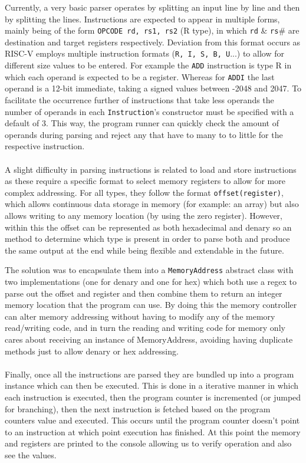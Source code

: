 \documentclass[a4paper,fleqn,twoside,12pt]{article}
\begin{document}
Currently, a very basic parser operates by splitting an input line by line and then by splitting the lines. Instructions are expected to appear in multiple forms, mainly being of the form \texttt{OPCODE rd, rs1, rs2} (R type), in which \texttt{rd} \& \texttt{rs}\# are destination and target registers respectively. Deviation from this format occurs as RISC-V employs multiple instruction formats (\texttt{R, I, S, B, U}...)\cite{risc_spec} to allow for different size values to be entered. For example the \texttt{ADD} instruction is type R in which each operand is expected to be a register. Whereas for \texttt{ADDI} the last operand is a 12-bit immediate, taking a signed values between -2048 and 2047. To facilitate the occurrence further of instructions that take less operands the number of operands in each \texttt{Instruction}'s constructor must be specified with a default of 3. This way, the program runner can quickly check the amount of operands during parsing and reject any that have to many to to little for the respective instruction.
\\\\
A slight difficulty in parsing instructions is related to load and store instructions as these require a specific format to select memory registers to allow for more complex addressing. For all types, they follow the format \texttt{offset(register)}, which allows continuous data storage in memory (for example: an array) but also allows writing to any memory location (by using the zero register). However, within this the offset can be represented as both hexadecimal and denary so an method to determine which type is present in order to parse both and produce the same output at the end while being flexible and extendable in the future.

The solution was to encapsulate them into a \texttt{MemoryAddress} abstract class with two implementations (one for denary and one for hex) which both use a regex to parse out the offset and register and then combine them to return an integer memory location that the program can use. By doing this the memory controller can alter memory addressing without having to modify any of the memory read/writing code, and in turn the reading and writing code for memory only cares about receiving an instance of MemoryAddress, avoiding having duplicate methods just to allow denary or hex addressing.
\\\\
Finally, once all the instructions are parsed they are bundled up into a program instance which can then be executed. This is done in a iterative manner in which each instruction is executed, then the program counter is incremented (or jumped for branching), then the next instruction is fetched based on the program counters value and executed. This occurs until the program counter doesn't point to an instruction at which point execution has finished. At this point the memory and registers are printed to the console allowing us to verify operation and also see the values.
\end{document}
